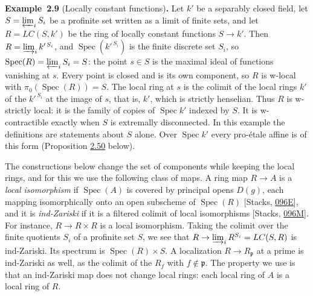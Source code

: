 \documentclass[11pt]{article}
\newenvironment{bpstatement}[2]{\par\addvspace{0.6\baselineskip}\noindent\textbf{#1}#2\textbf{.}\enspace\ignorespaces}
  {\par\addvspace{0.4\baselineskip}}
\begin{document}
\label{bp28}%
\begin{bpstatement}{Example~2.9}{ (Locally constant functions)}
Let \(k'\) be a separably closed field, let \(S=\varprojlim_iS_i\) be a profinite set written as a limit of finite sets, and let \(R=LC(S,k')\) be the ring of locally constant functions \(S\to k'\). Then \(R=\varinjlim_ik'^{\,S_i}\), and \(\operatorname{Spec}(k'^{\,S_i})\) is the finite discrete set \(S_i\), so \(\operatorname{Spec}(R)=\varprojlim_iS_i=S\): the point \(s\in S\) is the maximal ideal of functions vanishing at \(s\). Every point is closed and is its own component, so \(R\) is w-local with \(\pi_0(\operatorname{Spec}(R))=S\). The local ring at \(s\) is the colimit of the local rings \(k'\) of the \(k'^{\,S_i}\) at the image of \(s\), that is, \(k'\), which is strictly henselian. Thus \(R\) is w-strictly local: it is the family of copies of \(\operatorname{Spec}k'\) indexed by \(S\). It is w-contractible exactly when \(S\) is extremally disconnected. In this example the definitions are statements about \(S\) alone. Over \(\operatorname{Spec}k'\) every pro-étale affine is of this form (Proposition \hyperref[bp153]{2.50} below).
\end{bpstatement}

\label{bp29}%
The constructions below change the set of components while keeping the local rings, and for this we use the following class of maps. A ring map \(R\to A\) is a \emph{local isomorphism} if \(\operatorname{Spec}(A)\) is covered by principal opens \(D(g)\), each mapping isomorphically onto an open subscheme of \(\operatorname{Spec}(R)\) [Stacks, \href{https://stacks.math.columbia.edu/tag/096E}{096E}], and it is \emph{ind-Zariski} if it is a filtered colimit of local isomorphisms [Stacks, \href{https://stacks.math.columbia.edu/tag/096M}{096M}]. For instance, \(R\to R\times R\) is a local isomorphism. Taking the colimit over the finite quotients \(S_i\) of a profinite set \(S\), we see that \(R\to\varinjlim_iR^{S_i}=LC(S,R)\) is ind-Zariski. Its spectrum is \(\operatorname{Spec}(R)\times S\). A localization \(R\to R_{\mathfrak p}\) at a prime is ind-Zariski as well, as the colimit of the \(R_f\) with \(f\notin\mathfrak p\). The property we use is that an ind-Zariski map does not change local rings: each local ring of \(A\) is a local ring of \(R\).
\end{document}
